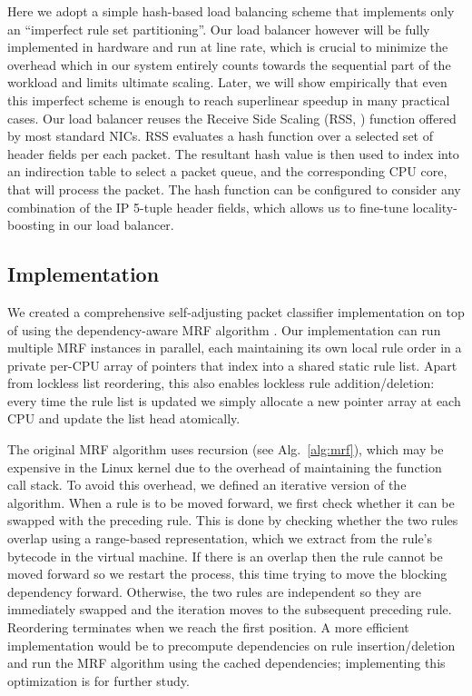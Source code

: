 Here we adopt a simple hash-based load balancing scheme that implements only an ``imperfect rule set partitioning''. Our load balancer however will be fully implemented in hardware and run at line rate, which is crucial to minimize the overhead which in our system entirely counts towards the sequential part of the workload and limits ultimate scaling.  Later, we will show empirically that even this imperfect scheme is enough to reach superlinear speedup in many practical cases. Our load balancer reuses the Receive Side Scaling (RSS, \cite{10.1145/3359989.3365412, rss-linux}) function offered by most standard NICs. RSS evaluates a hash function over a selected set of header fields per each packet. The resultant hash value is then used to index into an indirection table to select a packet queue, and the corresponding CPU core, that will process the packet. The hash function can be configured to consider any combination of the IP 5-tuple header fields, which allows us to fine-tune locality-boosting in our load balancer.

\subsection{Implementation}
\label{sec:sa-nf-tables-impl}

We created a comprehensive self-adjusting packet classifier implementation on top of \nftables using the dependency-aware MRF algorithm \cite{10228937}. Our implementation can run multiple MRF instances in parallel, each maintaining its own local rule order in a private per-CPU array of pointers that index into a shared static rule list. Apart from lockless list reordering, this also enables lockless rule addition\slash deletion: every time the rule list is updated we simply allocate a new pointer array at each CPU and update the list head atomically.

The original MRF algorithm uses recursion (see Alg.~\ref{alg:mrf}), which may be expensive in the Linux kernel due to the overhead of maintaining the function call stack. To avoid this overhead, we defined an iterative version of the algorithm. When a rule is to be moved forward, we first check whether it can be swapped with the preceding rule. This is done by checking whether the two rules overlap using a range-based representation, which we extract from the rule's bytecode in the \nftables virtual machine. If there is an overlap then the rule cannot be moved forward so we restart the process, this time trying to move the blocking dependency forward. Otherwise, the two rules are independent so they are immediately swapped and the iteration moves to the subsequent preceding rule. Reordering terminates when we reach the first position. A more efficient implementation would be to precompute dependencies on rule insertion\slash deletion and run the MRF algorithm using the cached dependencies; implementing this optimization is for further study. %

